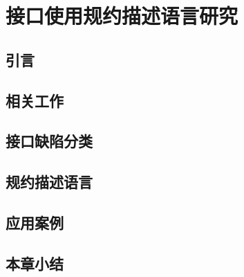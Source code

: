 \chapter{接口使用规约描述语言研究}
\label{cha:impsec}

\section{引言}
\section{相关工作}
\section{接口缺陷分类}
\section{规约描述语言}
\section{应用案例}
\section{本章小结}
